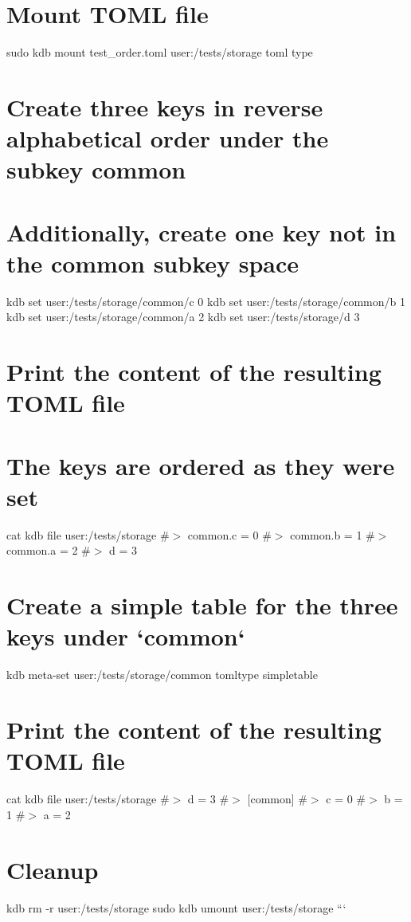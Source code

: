  \hypertarget{autotoc_md642_autotoc_md740}{}\section{Mount T\+O\+M\+L file}\label{autotoc_md642_autotoc_md740}
sudo kdb mount test\+\_\+order.\+toml user\+:/tests/storage toml type\hypertarget{autotoc_md642_autotoc_md741}{}\section{Create three keys in reverse alphabetical order under the subkey common}\label{autotoc_md642_autotoc_md741}
\hypertarget{autotoc_md642_autotoc_md742}{}\section{Additionally, create one key not in the common subkey space}\label{autotoc_md642_autotoc_md742}
kdb set \textquotesingle{}user\+:/tests/storage/common/c\textquotesingle{} \textquotesingle{}0\textquotesingle{} kdb set \textquotesingle{}user\+:/tests/storage/common/b\textquotesingle{} \textquotesingle{}1\textquotesingle{} kdb set \textquotesingle{}user\+:/tests/storage/common/a\textquotesingle{} \textquotesingle{}2\textquotesingle{} kdb set \textquotesingle{}user\+:/tests/storage/d\textquotesingle{} \textquotesingle{}3\textquotesingle{}\hypertarget{autotoc_md642_autotoc_md743}{}\section{Print the content of the resulting T\+O\+M\+L file}\label{autotoc_md642_autotoc_md743}
\hypertarget{autotoc_md642_autotoc_md744}{}\section{The keys are ordered as they were set}\label{autotoc_md642_autotoc_md744}
cat {\ttfamily kdb file user\+:/tests/storage} \#$>$ common.\+c = 0 \#$>$ common.\+b = 1 \#$>$ common.\+a = 2 \#$>$ d = 3\hypertarget{autotoc_md642_autotoc_md745}{}\section{Create a simple table for the three keys under `common`}\label{autotoc_md642_autotoc_md745}
kdb meta-\/set \textquotesingle{}user\+:/tests/storage/common\textquotesingle{} \textquotesingle{}tomltype\textquotesingle{} \textquotesingle{}simpletable\textquotesingle{}\hypertarget{autotoc_md642_autotoc_md746}{}\section{Print the content of the resulting T\+O\+M\+L file}\label{autotoc_md642_autotoc_md746}
cat {\ttfamily kdb file user\+:/tests/storage} \#$>$ d = 3 \#$>$ \mbox{[}common\mbox{]} \#$>$ c = 0 \#$>$ b = 1 \#$>$ a = 2\hypertarget{autotoc_md642_autotoc_md747}{}\section{Cleanup}\label{autotoc_md642_autotoc_md747}
kdb rm -\/r user\+:/tests/storage sudo kdb umount user\+:/tests/storage ```

